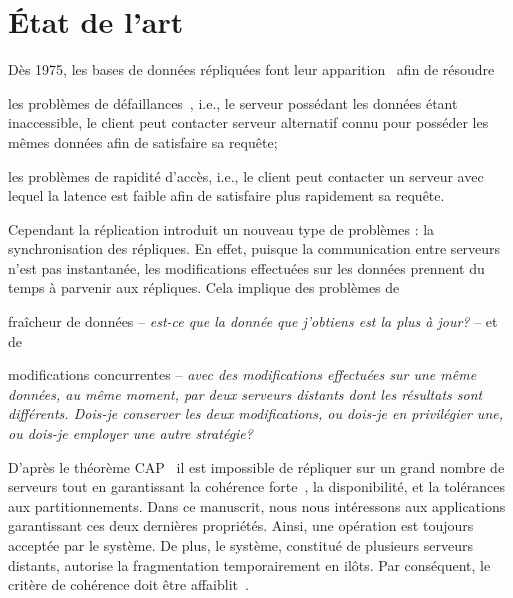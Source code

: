 

\section{État de l'art}
\label{repl:sec:stateoftheart}

Dès 1975, les bases de données répliquées font leur
apparition~\cite{johnson1975maintenance} afin de résoudre
\begin{inparaenum}[(i)]
\item les problèmes de défaillances~\cite{alsberg1976principle}, i.e., le
  serveur possédant les données étant inaccessible, le client peut contacter
  serveur alternatif connu pour posséder les mêmes données afin de satisfaire sa
  requête;
\item les problèmes de rapidité d'accès, i.e., le client peut contacter un
  serveur avec lequel la latence est faible afin de satisfaire plus rapidement
  sa requête.
\end{inparaenum}

Cependant la réplication introduit un nouveau type de problèmes : la
synchronisation des répliques. En effet, puisque la communication entre serveurs
n'est pas instantanée, les modifications effectuées sur les données prennent du
temps à parvenir aux répliques. Cela implique des problèmes de
\begin{inparaenum}[(i)]
\item fraîcheur de données -- \emph{est-ce que la donnée que j'obtiens est la
    plus à jour?} -- et de
\item modifications concurrentes -- \emph{avec des modifications effectuées sur
    une même données, au même moment, par deux serveurs distants dont les
    résultats sont différents. Dois-je conserver les deux modifications, ou
    dois-je en privilégier une, ou dois-je employer une autre stratégie?}
\end{inparaenum}


D'après le théorème CAP~\cite{brewer2012cap, gilbert2002brewer} il est
impossible de répliquer sur un grand nombre de serveurs tout en garantissant la
cohérence forte~\cite{herlihy1990linearizability}, la disponibilité, et la
tolérances aux partitionnements. Dans ce manuscrit, nous nous intéressons aux
applications garantissant ces deux dernières propriétés. Ainsi, une opération
est toujours acceptée par le système. De plus, le système, constitué de
plusieurs serveurs distants, autorise la fragmentation temporairement en
ilôts. Par conséquent, le critère de cohérence doit être
affaiblit~\cite{bailis2013eventual, shapiro2011conflict}.


